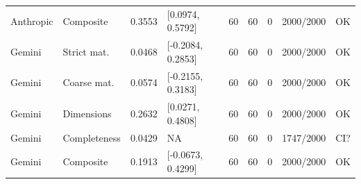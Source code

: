 \begin{table}[t]
{\begin{tabular}{lllllllll}
Anthropic & Composite & 0.3553 & [0.0974, 0.5792] & 60 & 60 & 0 & 2000/2000 & OK \\
Gemini & Strict mat. & 0.0468 & [-0.2084, 0.2853] & 60 & 60 & 0 & 2000/2000 & OK \\
Gemini & Coarse mat. & 0.0574 & [-0.2155, 0.3183] & 60 & 60 & 0 & 2000/2000 & OK \\
Gemini & Dimensions & 0.2632 & [0.0271, 0.4808] & 60 & 60 & 0 & 2000/2000 & OK \\
Gemini & Completeness & 0.0429 & NA & 60 & 60 & 0 & 1747/2000 & CI? \\
Gemini & Composite & 0.1913 & [-0.0673, 0.4299] & 60 & 60 & 0 & 2000/2000 & OK \\
\bottomrule
\end{tabular}}
\end{table}

